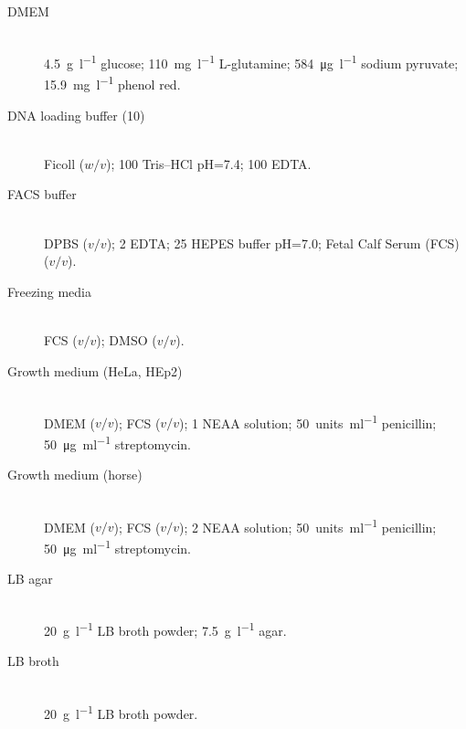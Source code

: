   \begin{table}
    \label{tab:methods:solutions}
    \begin{description}
    \item[DMEM] \hfill \\
      \SI{4.5}{\g\per\l}   glucose;
      \SI{110}{\mg\per\l}  L-glutamine;
      \SI{584}{\ug\per\l}  sodium pyruvate;
      \SI{15.9}{\mg\per\l} phenol red.

    \item[DNA loading buffer (\SI{10}{\X})] \hfill \\
       Ficoll ($w/v$);
      \SI{100}{\mM}      Tris--HCl pH=\num{7.4};
      \SI{100}{\mM}      EDTA.

    \item[FACS buffer] \hfill \\
       DPBS ($v/v$); %
      \SI{2}{\mM} EDTA;                         %
      \SI{25}{\mM} HEPES buffer pH=\num{7.0};   %
       Fetal Calf Serum (FCS) ($v/v$).                    %

    \item[Freezing media] \hfill \\
       FCS ($v/v$);
       DMSO ($v/v$).

    \item[Growth medium (HeLa, HEp2)] \hfill \\
                  DMEM ($v/v$);   %
                   FCS ($v/v$);    %
      \SI{1}{\X}            NEAA solution;  %
      \SI{50}{units\per\ml} penicillin;     %
      \SI{50}{\ug\per\ml}   streptomycin.   %

    \item[Growth medium (horse)] \hfill \\
                  DMEM ($v/v$);   %
                  FCS ($v/v$);    %
      \SI{2}{\X}            NEAA solution;  %
      \SI{50}{units\per\ml} penicillin;     %
      \SI{50}{\ug\per\ml}   streptomycin.   %

    \item[LB agar] \hfill \\
      \SI{20}{\g\per\l}  LB broth powder;
      \SI{7.5}{\g\per\l} agar.

    \item[LB broth] \hfill \\
      \SI{20}{\g\per\l} LB broth powder.


\end{description}
\end{table}
